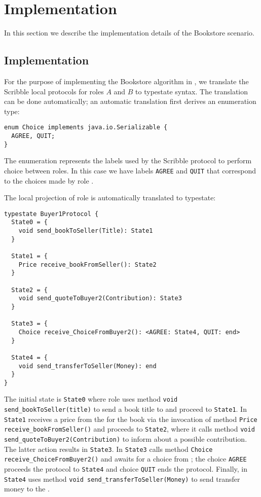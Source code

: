 \section{Implementation}
In this section we describe the implementation
details of the Bookstore scenario.

\subsection{\Mungo Implementation}

For the purpose of implementing the Bookstore
algorithm in \Mungo,
we translate the Scribble local protocols for roles
$A$ and $B$ to \Mungo typestate syntax.
The translation can be done automatically;
an automatic translation first derives an
enumeration type:

\begin{lstlisting}[caption={Enumeration for the communication choice}]
enum Choice implements java.io.Serializable {
  AGREE, QUIT;
}
\end{lstlisting}

The enumeration represents the
labels used by the Scribble protocol
to perform choice between roles. In this
case we have labels \lstinline|AGREE| and
\lstinline|QUIT| that correspond to the choices
made by role \BuyerTwo.

The local projection of role \BuyerOne is automatically translated to typestate:

\begin{lstlisting}[caption={Typestate for Role \BuyerOne}]
typestate Buyer1Protocol {
  State0 = {
    void send_bookToSeller(Title): State1
  }

  State1 = {
    Price receive_bookFromSeller(): State2
  }

  State2 = {
    void send_quoteToBuyer2(Contribution): State3
  }

  State3 = {
    Choice receive_ChoiceFromBuyer2(): <AGREE: State4, QUIT: end>
  }

  State4 = {
    void send_transferToSeller(Money): end
  }
}
\end{lstlisting}

The initial state is \lstinline|State0| where
role \BuyerOne uses method \lstinline|void send_bookToSeller(title)|
to send a book title to \Seller
and proceed to \lstinline|State1|. In \lstinline|State1|
\BuyerOne receives a price from the \Seller for the book via
the invocation of method \lstinline|Price receive_bookFromSeller()|
and proceeds to \lstinline|State2|, where
it calls method \lstinline|void send_quoteToBuyer2(Contribution)|
to inform \BuyerTwo about a  possible contribution. The latter
action results in \lstinline|State3|.
In \lstinline|State3| \BuyerOne calls method
\lstinline|Choice receive_ChoiceFromBuyer2()| and awaits
for a choice from \BuyerTwo; the choice \lstinline|AGREE|
proceeds the protocol to \lstinline|State4| and
choice \lstinline|QUIT| ends the protocol. Finally,
in \lstinline|State4| \BuyerOne uses method
\lstinline|void send_transferToSeller(Money)| to
send transfer money to the \Seller.


